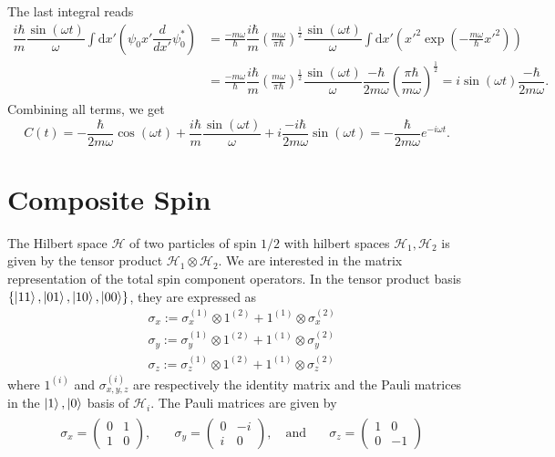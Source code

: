 \documentclass[10pt, a4paper]{article}
\begin{document}
The last integral reads 
\begin{align*}
    \dfrac{i \hbar}{m} \dfrac{\sin(\omega t)}{\omega} \int \text{d}x'  \left( \psi_0 x' \dfrac{d}{dx'} \psi_0^*  \right) &= \frac{-m \omega}{\hbar}\dfrac{i \hbar}{m} \left(\frac{m \omega}{\pi \hbar}\right)^{\frac{1}{2}}  \dfrac{\sin(\omega t)}{\omega} \int \text{d}x'  \left(x'^2  \exp \left(-\frac{m \omega}{\hbar} x'^2\right)\right) \\
    &= \frac{-m \omega}{\hbar}\dfrac{i \hbar}{m} \left(\frac{m \omega}{\pi \hbar}\right)^{\frac{1}{2}}  \dfrac{\sin(\omega t)}{\omega} \dfrac{-\hbar}{2 m\omega}\left(\dfrac{\pi \hbar}{m \omega}\right)^{\frac12} = i \sin(\omega t) \dfrac{-\hbar}{2 m\omega}. 
\end{align*}
Combining all terms, we get 
$$
C(t) = -\dfrac{\hbar}{2 m\omega}\cos(\omega t) +   \dfrac{i \hbar}{m} \dfrac{\sin(\omega t)}{\omega} + i \dfrac{-i\hbar}{2 m\omega} \sin(\omega t)  = - \dfrac{\hbar}{2 m\omega} e^{-i \omega t}.
$$


\section{Composite Spin}
The Hilbert space $\mathcal{H}$ of two particles of spin $1/2$ with hilbert spaces $\mathcal{H}_1, \mathcal{H}_2$ is given by the tensor product $\mathcal{H}_1 \otimes \mathcal{H}_2$. We are interested in the matrix representation of the total spin component operators. In the tensor product basis $\{\ket{11}, \ket{01}, \ket{10}, \ket{00}\}$, they are expressed as  
\begin{align*}
    &\sigma_x := \sigma_x^{(1)} \otimes 1^{(2)} + 1^{(1)} \otimes \sigma_x^{(2)}\\
    &\sigma_y := \sigma_y^{(1)} \otimes 1^{(2)} + 1^{(1)} \otimes \sigma_y^{(2)}\\
    &\sigma_z := \sigma_z^{(1)} \otimes 1^{(2)} + 1^{(1)} \otimes \sigma_z^{(2)}
\end{align*}
where $1^{(i)}$ and $\sigma_{x, y, z}^{(i)}$ are respectively the identity matrix and the Pauli matrices in the ${\ket{1}, \ket{0}}$ basis of $\mathcal{H}_i$. The Pauli matrices are given by 
\begin{align*}
    \begin{aligned}
        & \sigma_{x}=\begin{pmatrix}
        0 & 1 \\
        1 & 0
        \end{pmatrix}, \quad 
        & \sigma_{y}=
        \begin{pmatrix}
        0 & -i \\
        i & 0
        \end{pmatrix}, \quad \text{and} \quad 
        & \sigma_{z}=\begin{pmatrix}
        1 & 0 \\
        0 & -1
        \end{pmatrix}
        \end{aligned}
\end{align*}
\end{document}
